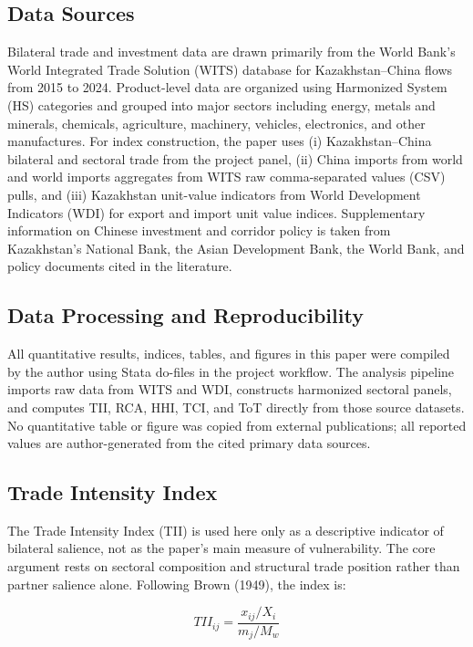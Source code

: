 \documentclass[12pt]{article}
\begin{document}
\subsection{Data Sources}

Bilateral trade and investment data are drawn primarily from the World Bank's World Integrated Trade Solution (WITS) database for Kazakhstan--China flows from 2015 to 2024. Product-level data are organized using Harmonized System (HS) categories and grouped into major sectors including energy, metals and minerals, chemicals, agriculture, machinery, vehicles, electronics, and other manufactures. For index construction, the paper uses (i) Kazakhstan--China bilateral and sectoral trade from the project panel, (ii) China imports from world and world imports aggregates from WITS raw comma-separated values (CSV) pulls, and (iii) Kazakhstan unit-value indicators from World Development Indicators (WDI) for export and import unit value indices. Supplementary information on Chinese investment and corridor policy is taken from Kazakhstan's National Bank, the Asian Development Bank, the World Bank, and policy documents cited in the literature.

\subsection{Data Processing and Reproducibility}

All quantitative results, indices, tables, and figures in this paper were compiled by the author using Stata do-files in the project workflow. The analysis pipeline imports raw data from WITS and WDI, constructs harmonized sectoral panels, and computes TII, RCA, HHI, TCI, and ToT directly from those source datasets. No quantitative table or figure was copied from external publications; all reported values are author-generated from the cited primary data sources.

\subsection{Trade Intensity Index}

The Trade Intensity Index (TII) is used here only as a descriptive indicator of bilateral salience, not as the paper's main measure of vulnerability. The core argument rests on sectoral composition and structural trade position rather than partner salience alone. Following Brown (1949), the index is:

\begin{equation}
TII_{ij} = \frac{x_{ij}/X_i}{m_j/M_w}
\end{equation}
\end{document}

